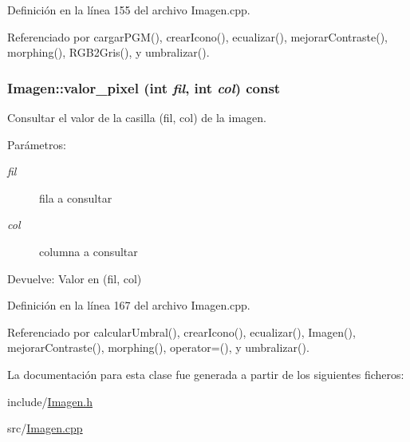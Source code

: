 Definición en la línea 155 del archivo Imagen.cpp.

Referenciado por cargarPGM(), crearIcono(), ecualizar(), mejorarContraste(), morphing(), RGB2Gris(), y umbralizar().\hypertarget{classImagen_415bc0106229748b010bfc4f90b4f52c}{
\subsubsection[valor\_\-pixel]{ Imagen::valor\_\-pixel (int {\em fil}, \/  int {\em col}) const}}
\label{classImagen_415bc0106229748b010bfc4f90b4f52c}


Consultar el valor de la casilla (fil, col) de la imagen. 

\begin{Desc}
\item[Parámetros:]
\begin{description}
\item[{\em fil}]fila a consultar \item[{\em col}]columna a consultar \end{description}
\end{Desc}
\begin{Desc}
\item[Devuelve:]Valor en (fil, col) \end{Desc}


Definición en la línea 167 del archivo Imagen.cpp.

Referenciado por calcularUmbral(), crearIcono(), ecualizar(), Imagen(), mejorarContraste(), morphing(), operator=(), y umbralizar().

La documentación para esta clase fue generada a partir de los siguientes ficheros:\begin{CompactItemize}
\item 
include/\hyperlink{Imagen_8h}{Imagen.h}\item 
src/\hyperlink{Imagen_8cpp}{Imagen.cpp}\end{CompactItemize}
